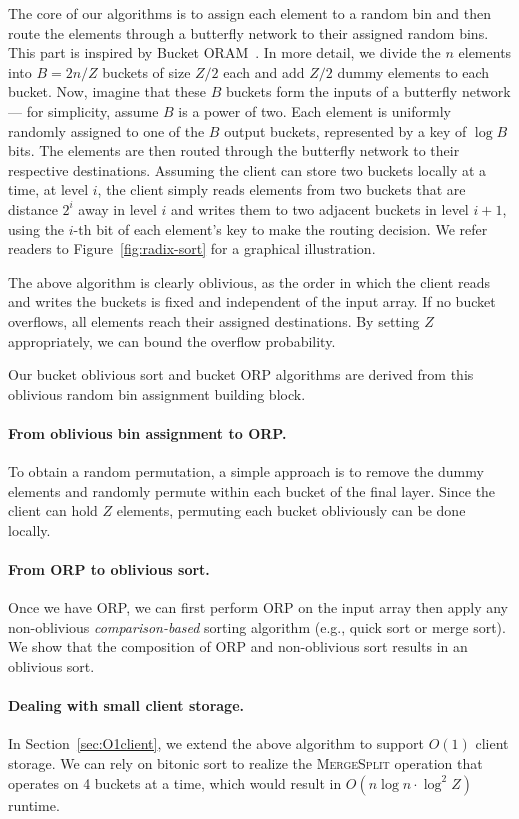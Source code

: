 The core of our algorithms is to assign each element to a random bin and then route the elements through a butterfly network to their assigned random bins. 
This part is inspired by Bucket ORAM~\cite{fletcher2015bucket}. 
In more detail, we divide the $n$ elements into $B=2n/Z$ buckets of size $Z/2$ each and add $Z/2$ dummy elements to each bucket.
Now, imagine that these $B$ buckets form the inputs of a butterfly network --- for simplicity, assume $B$ is a power of two.
Each element is uniformly randomly assigned to one of the $B$ output buckets, represented by a key of $\log B$ bits.
The elements are then routed through the butterfly network to their respective destinations.
Assuming the client can store two buckets locally at a time, at level $i$, the client simply reads elements from two buckets that are distance $2^i$ away in level $i$ and writes them to two adjacent buckets in level $i+1$, using the $i$-th bit of each element's key to make the routing decision. 
We refer readers to Figure~\ref{fig:radix-sort} for a graphical illustration.

The above algorithm is clearly oblivious, as the order in which the client reads and writes the buckets is fixed and independent of the input array. If no bucket overflows, all elements reach their assigned destinations. By setting $Z$ appropriately, we can bound the overflow probability.

Our bucket oblivious sort and bucket ORP algorithms are derived from
this oblivious random bin assignment building block. 

\paragraph{From oblivious bin assignment to ORP.}
To obtain a random permutation, 
a simple approach is to remove the dummy elements and randomly permute 
within each bucket of the final layer.
Since the client can hold $Z$ elements, permuting each bucket
obliviously can be done locally. 

\paragraph{From ORP to oblivious sort.}
Once we have ORP, we can first perform ORP on the input array then apply any non-oblivious
{\it comparison-based} sorting algorithm (e.g., quick sort or
merge sort). We show that the composition of ORP and non-oblivious sort results in an oblivious sort. 

\paragraph{Dealing with small client storage.}
In Section~\ref{sec:O1client}, we extend the above algorithm
to support $O(1)$ client storage. 
We can rely on bitonic sort to realize the \textsc{MergeSplit} operation that operates on 4 buckets at a time,
which would result in $O(n\log n\cdot \log^2 Z)$ runtime. 

